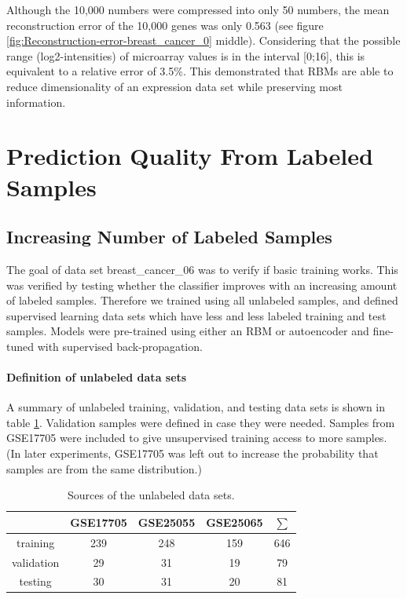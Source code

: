 Although the 10,000 numbers were compressed into only 50 numbers,
the mean reconstruction error of the 10,000 genes was only 0.563 (see
figure \ref{fig:Reconstruction-error-breast_cancer_0} middle). Considering
that the possible range (log2-intensities) of microarray values is
in the interval {[}0;16{]}, this is equivalent to a relative error
of 3.5\%. This demonstrated that RBMs are able to reduce dimensionality
of an expression data set while preserving most information.

\section{Prediction Quality From Labeled Samples\label{sec:breast_cancer_06-and-breast_cancer_07}}

\subsection{Increasing Number of Labeled Samples}

The goal of data set breast\_cancer\_06
was to verify if basic training works. This was verified by testing
whether the classifier improves with an increasing amount of labeled
samples. Therefore we trained using all unlabeled samples, and defined
supervised learning data sets which have less and less labeled training
and test samples. Models were pre-trained using either an RBM or autoencoder
and fine-tuned with supervised back-propagation.

\paragraph{Definition of unlabeled data sets\label{par:Definition-of-unlabeled-data-sets-for-breast_cancer_06}}

A summary of unlabeled training, validation, and testing data sets
is shown in table \ref{tab:unlabeled-data-sets-of-breast_cancer_06}.
Validation samples were defined in case they were needed. Samples
from GSE17705 were included to give unsupervised training access to
more samples. (In later experiments, GSE17705 was left out to increase
the probability that samples are from the same distribution.)

\begin{table}
\begin{centering}
\begin{tabular}{|c|c|c||c|c||c||c|}
\hline 
 & GSE17705 & \multicolumn{2}{c|}{GSE25055} & \multicolumn{2}{c||}{GSE25065} & $\sum$\tabularnewline
\hline 
training & 239 & \multicolumn{2}{c|}{248} & \multicolumn{2}{c||}{159} & 646\tabularnewline
\hline 
validation & 29 & \multicolumn{2}{c|}{31} & \multicolumn{2}{c||}{19} & 79\tabularnewline
\hline 
testing & 30 & \multicolumn{2}{c|}{31} & \multicolumn{2}{c||}{20} & 81\tabularnewline
\hline 
\end{tabular}
\par\end{centering}
\caption{\label{tab:unlabeled-data-sets-of-breast_cancer_06}Sources of the
unlabeled data sets.}
\end{table}

